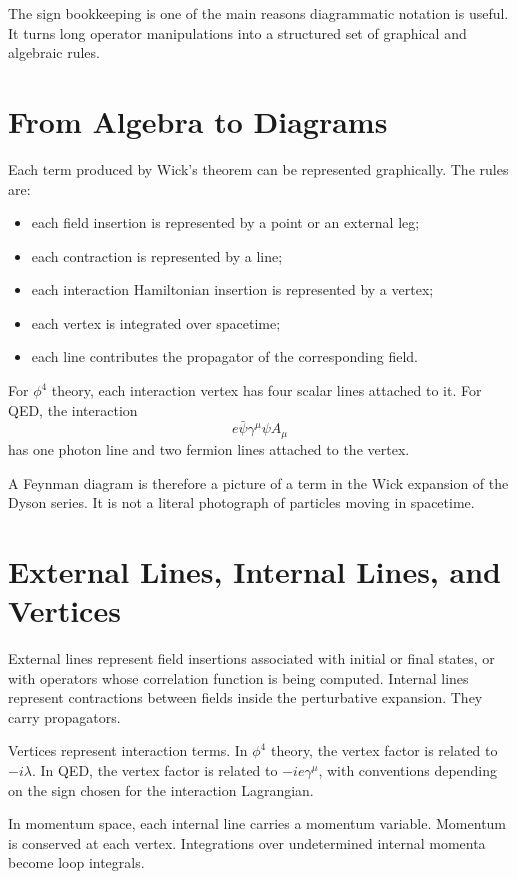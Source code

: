 The sign bookkeeping is one of the main reasons diagrammatic notation is useful.
It turns long operator manipulations into a structured set of graphical and
algebraic rules.

\section{From Algebra to Diagrams}

Each term produced by Wick's theorem can be represented graphically. The rules
are:
\begin{itemize}
    \item each field insertion is represented by a point or an external leg;
    \item each contraction is represented by a line;
    \item each interaction Hamiltonian insertion is represented by a vertex;
    \item each vertex is integrated over spacetime;
    \item each line contributes the propagator of the corresponding field.
\end{itemize}
For \(\phi^4\) theory, each interaction vertex has four scalar lines attached to
it. For QED, the interaction
\[
    e\bar\psi\gamma^\mu\psi A_\mu
\]
has one photon line and two fermion lines attached to the vertex.

A Feynman diagram is therefore a picture of a term in the Wick expansion of the
Dyson series. It is not a literal photograph of particles moving in spacetime.

\section{External Lines, Internal Lines, and Vertices}

External lines represent field insertions associated with initial or final
states, or with operators whose correlation function is being computed. Internal
lines represent contractions between fields inside the perturbative expansion.
They carry propagators.

Vertices represent interaction terms. In \(\phi^4\) theory, the vertex factor is
related to \(-i\lambda\). In QED, the vertex factor is related to
\(-ie\gamma^\mu\), with conventions depending on the sign chosen for the
interaction Lagrangian.

In momentum space, each internal line carries a momentum variable. Momentum is
conserved at each vertex. Integrations over undetermined internal momenta become
loop integrals.


